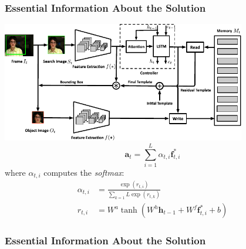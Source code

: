 
\begin{frame}
  \frametitle{Essential Information About the Solution}
  \centering\includegraphics[width=0.8\textwidth]{img/template-Schema.pdf}
  \begin{equation}
      \mathbf{a}_t = \sum_{i=1}^{L}\alpha_{t,i}\mathbf{f}_{t,i}^{*}
  \end{equation}
  where $\alpha_{t,i}$ computes the \emph{softmax}:
  \begin{align}
      \alpha_{t,i} &= \frac{\exp(r_{t,i})}{\sum_{k=1}{L}\exp(r_{t,k})}
      \\
      r_{t,i} &= W^a \tanh\left( W^h \mathbf{h}_{t-1} + W^f\mathbf{f}_{t,i}^{*} + b \right)
  \end{align}
\end{frame}

\begin{frame}\frametitle{Essential Information About the Solution}
\end{frame}


